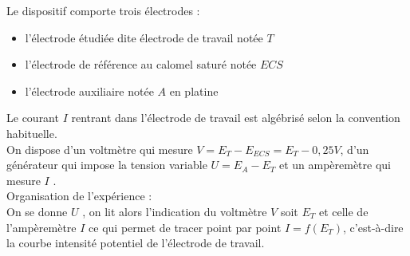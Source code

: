 \documentclass[a4paper]{article}
\begin{document}
\pagestyle{fancy}
\fancyhf{}
\setlength{\headheight}{15pt}

\begin{center}
	\large{}
\end{center}


Le dispositif comporte trois électrodes :\begin{itemize}
\item
l’électrode étudiée dite électrode de travail notée \(T\)
\item 
l’électrode de référence au calomel saturé notée \(ECS\)
\item
l’électrode auxiliaire notée \(A\) en platine
\end{itemize}
Le courant \(I\) rentrant dans l’électrode de travail est algébrisé selon la convention habituelle.\\
On dispose d’un voltmètre qui mesure \(V = E_T - E_{ECS} = E_T - 0, 25 V\), d’un générateur qui impose la tension variable \(U = E_A - E_T\) et un ampèremètre qui mesure \(I\) .\\
Organisation de l’expérience :\\
On se donne \(U\) , on lit alors l’indication du voltmètre \(V\) soit \(E_T\) et celle de l’ampèremètre \(I\) ce
qui permet de tracer point par point \(I = f (E_T )\), c'est-à-dire la courbe intensité potentiel de l’électrode de travail.
\end{document}
